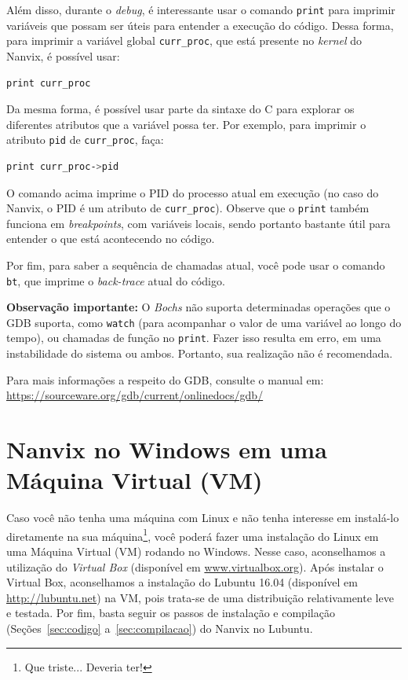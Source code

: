 \documentclass[11pt]{article}
\begin{document}
Além disso, durante o \textit{debug}, é interessante usar o comando \texttt{print} para imprimir variáveis que possam ser úteis para entender a execução do código. Dessa forma, para imprimir a variável global \texttt{curr\_proc}, que está presente no \textit{kernel} do Nanvix, é possível usar:\\

\begin{lstlisting}[language=sh,numbers=none,frame=single]
print curr_proc
\end{lstlisting}

Da mesma forma, é possível usar parte da sintaxe do C para explorar os diferentes atributos que a variável possa ter. Por exemplo, para imprimir o atributo \texttt{pid} de \texttt{curr\_proc}, faça:\\

\begin{lstlisting}[language=sh,numbers=none,frame=single]
print curr_proc->pid
\end{lstlisting}

O comando acima imprime o PID do processo atual em execução (no caso do Nanvix, o PID é um atributo de \texttt{curr\_proc}). Observe que o \texttt{print} também funciona em \textit{breakpoints}, com variáveis locais, sendo portanto bastante útil para entender o que está acontecendo no código.

Por fim, para saber a sequência de chamadas atual, você pode usar o comando \texttt{bt}, que imprime o \textit{back-trace} atual do código.

\textbf{Observação importante:} O \textit{Bochs} não suporta determinadas operações que o GDB suporta, como \texttt{watch} (para acompanhar o valor de uma variável ao longo do tempo), ou chamadas de função no \texttt{print}. Fazer isso resulta em erro, em uma instabilidade do sistema ou ambos. Portanto, sua realização não é recomendada. 

Para mais informações a respeito do GDB, consulte o manual em: \url{https://sourceware.org/gdb/current/onlinedocs/gdb/}

\section{Nanvix no Windows em uma Máquina Virtual (VM)}
\label{sec:vm}

Caso você não tenha uma máquina com Linux e não tenha interesse em instalá-lo diretamente na sua máquina\footnote{Que triste... Deveria ter!}, você poderá fazer uma instalação do Linux em uma Máquina Virtual (VM) rodando no Windows. Nesse caso, aconselhamos a utilização do \textit{Virtual Box}
(disponível em \url{www.virtualbox.org}). Após instalar o Virtual Box, aconselhamos a instalação do Lubuntu 16.04 (disponível em \url{http://lubuntu.net}) na VM, pois trata-se de uma distribuição relativamente leve e testada. Por fim, basta seguir os passos de instalação e compilação (Seções~\ref{sec:codigo} a~\ref{sec:compilacao}) do Nanvix no Lubuntu.
\end{document}
